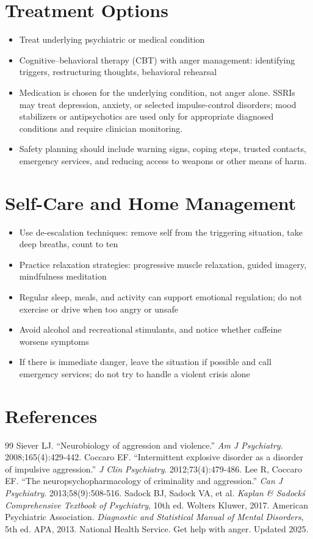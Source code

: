 \section*{Treatment Options}
\begin{itemize}
 \item Treat underlying psychiatric or medical condition
 \item Cognitive--behavioral therapy (CBT) with anger management: identifying triggers, restructuring thoughts, behavioral rehearsal
 \item Medication is chosen for the underlying condition, not anger alone. SSRIs may treat depression, anxiety, or selected impulse-control disorders; mood stabilizers or antipsychotics are used only for appropriate diagnosed conditions and require clinician monitoring.
 \item Safety planning should include warning signs, coping steps, trusted contacts, emergency services, and reducing access to weapons or other means of harm.
\end{itemize}

\section*{Self-Care and Home Management}
\begin{itemize}
 \item Use de-escalation techniques: remove self from the triggering situation, take deep breaths, count to ten
 \item Practice relaxation strategies: progressive muscle relaxation, guided imagery, mindfulness meditation
 \item Regular sleep, meals, and activity can support emotional regulation; do not exercise or drive when too angry or unsafe
 \item Avoid alcohol and recreational stimulants, and notice whether caffeine worsens symptoms
 \item If there is immediate danger, leave the situation if possible and call emergency services; do not try to handle a violent crisis alone
\end{itemize}

\section*{References}
\begin{thebibliography}{99}
 Siever LJ. ``Neurobiology of aggression and violence.'' \textit{Am J Psychiatry}. 2008;165(4):429-442.
 Coccaro EF. ``Intermittent explosive disorder as a disorder of impulsive aggression.'' \textit{J Clin Psychiatry}. 2012;73(4):479-486.
 Lee R, Coccaro EF. ``The neuropsychopharmacology of criminality and aggression.'' \textit{Can J Psychiatry}. 2013;58(9):508-516.
 Sadock BJ, Sadock VA, et al. \textit{Kaplan \& Sadock\'s Comprehensive Textbook of Psychiatry}, 10th ed. Wolters Kluwer, 2017.
 American Psychiatric Association. \textit{Diagnostic and Statistical Manual of Mental Disorders}, 5th ed. APA, 2013.
 National Health Service. Get help with anger. Updated 2025.
\end{thebibliography}
